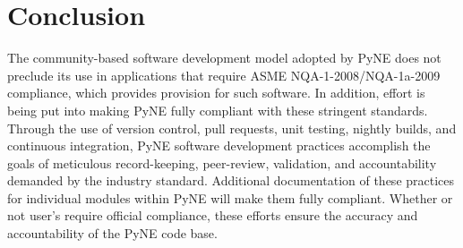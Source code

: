\documentclass{anstrans}
\begin{document}
\section{Conclusion}

The community-based software development model adopted by PyNE does not
preclude its use in applications that require ASME NQA-1-2008/NQA-1a-2009
compliance, which provides provision for such software. In addition, effort is
being put into making PyNE fully compliant with these stringent standards.
Through the use of version control, pull requests, unit testing, nightly builds, and
continuous integration, PyNE software development practices accomplish the
goals of meticulous record-keeping, peer-review, validation, and accountability
demanded by the industry standard. Additional documentation of these practices for
individual modules within PyNE will make them fully compliant. Whether or not
user's require official compliance, these efforts ensure the accuracy and
accountability of the PyNE code base.




\end{document}
